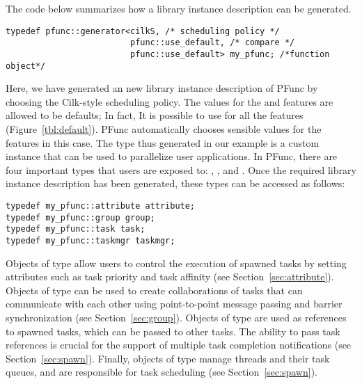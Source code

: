 %
The code below summarizes how a library instance description can be 
generated.
%
\begin{center}
\begin{minipage}{0.75\textwidth}
\begin{lstlisting}
typedef pfunc::generator<cilkS, /* scheduling policy */
                         pfunc::use_default, /* compare */
                         pfunc::use_default> my_pfunc; /*function object*/
\end{lstlisting}
\end{minipage}
\end{center}
%
Here, we have generated an new library instance description of PFunc by
choosing the Cilk-style scheduling policy. 
%
The values for the  and  features are
allowed to be defaults; In fact, It is possible to use
 for all the features (Figure~\ref{tbl:default}).  
%
PFunc automatically chooses sensible values for the features in this case.  
%
The type  thus generated in our example
is a custom instance that can be used to parallelize user applications. 
%
In PFunc, there are four important types that users are exposed to:
, ,  and .  
%
Once the required library instance description has been generated, these types
can be accessed as follows:

\begin{center}
\begin{minipage}{0.4\textwidth}
\begin{lstlisting}
typedef my_pfunc::attribute attribute; 
typedef my_pfunc::group group; 
typedef my_pfunc::task task; 
typedef my_pfunc::taskmgr taskmgr; 
\end{lstlisting}
\end{minipage}
\end{center}

Objects of type  allow users to control the execution of
spawned tasks by setting attributes such as task priority and task affinity
(see Section~\ref{sec:attribute}).
Objects of type  can be used to create collaborations of tasks that
can communicate with each other using point-to-point message passing and
barrier synchronization (see Section~\ref{sec:group}).
Objects of type  are used as references to spawned tasks, which 
can be passed to other tasks. The ability to pass task references is crucial
for the support of multiple task completion notifications (see
Section~\ref{sec:spawn}).
Finally, objects of type  manage threads and their task
queues, and are responsible for task scheduling (see Section~\ref{sec:spawn}).

